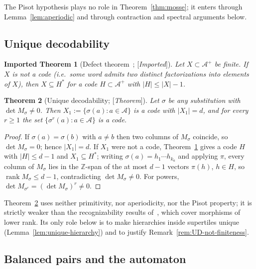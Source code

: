 \documentclass[11pt]{amsart}
\theoremstyle{plain}
\newtheorem{theorem}{Theorem}[section]
\newtheorem{importedtheorem}[theorem]{Imported Theorem}
\theoremstyle{definition}
\theoremstyle{remark}
\newcommand{\Z}{\mathbb{Z}}
\newcommand{\A}{\mathcal{A}}
\newcommand{\rank}{\operatorname{rank}}
\newcommand{\Status}[1]{\textup{[\textit{#1}]}}
\begin{document}
The Pisot hypothesis plays no role in Theorem~\ref{thm:mosse}; it enters through Lemma~\ref{lem:aperiodic} and through contraction and spectral arguments below.

\subsection{Unique decodability}\label{sec:UD}

\begin{importedtheorem}[Defect theorem~\cite{BPPR,BPR}; \Status{Imported}]\label{thm:defect}
Let $X\subset\A^+$ be finite. If $X$ is not a code (i.e.\ some word admits two distinct factorizations into elements of $X$), then $X\subseteq H^*$ for a code $H\subset\A^+$ with $|H|\le|X|-1$.
\end{importedtheorem}

\begin{theorem}[Unique decodability; \Status{Theorem}]\label{thm:UD}
Let $\sigma$ be any substitution with $\det M_\sigma\ne0$. Then $X_1:=\{\sigma(a):a\in\A\}$ is a code with $|X_1|=d$, and for every $r\ge1$ the set $\{\sigma^r(a):a\in\A\}$ is a code.
\end{theorem}
\begin{proof}
If $\sigma(a)=\sigma(b)$ with $a\ne b$ then two columns of $M_\sigma$ coincide, so $\det M_\sigma=0$; hence $|X_1|=d$. If $X_1$ were not a code, Theorem~\ref{thm:defect} gives a code $H$ with $|H|\le d-1$ and $X_1\subseteq H^*$; writing $\sigma(a)=h_1\cdots h_{k_a}$ and applying $\pi$, every column of $M_\sigma$ lies in the $\Z$-span of the at most $d-1$ vectors $\pi(h)$, $h\in H$, so $\rank M_\sigma\le d-1$, contradicting $\det M_\sigma\ne0$. For powers, $\det M_{\sigma^r}=(\det M_\sigma)^r\neq0$.
\end{proof}

Theorem~\ref{thm:UD} uses neither primitivity, nor aperiodicity, nor the Pisot property; it is strictly weaker than the recognizability results of~\cite{BSTY}, which cover morphisms of lower rank. Its only role below is to make hierarchies inside supertiles unique (Lemma~\ref{lem:unique-hierarchy}) and to justify Remark~\ref{rem:UD-not-finiteness}.

\subsection{Balanced pairs and the automaton}\label{sec:bpa-def}
\end{document}
